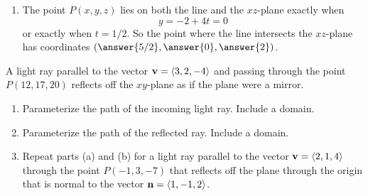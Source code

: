 \documentclass{ximera}
\begin{document}
\begin{example}
\begin{explanation}
\begin{enumerate}
\item The point $P(x,y,z)$ lies on both the line and the $xz$-plane exactly when
\[
     y = -2 + 4t = 0 
\]
or exactly when $t=1/2$. So the point where the line intersects the $xz$-plane has coordinates $(\answer{5/2}, \answer{0}, \answer{2})$.
\end{enumerate} 
\end{explanation}

\end{example} 


\begin{question}  \label{Qdr5577:Lines}
A light ray parallel to the vector ${\bf v} = \langle 3,2,-4 \rangle$ and passing through the point $P(12, 17,20)$ reflects off the $xy$-plane as if the plane were a mirror.

\begin{enumerate}

\item Parameterize the path of the incoming light ray. Include a domain.

\item Parameterize the path of the reflected ray. Include a domain.

\item Repeat parts (a) and (b) for a light ray parallel to the vector ${\bf v} = \langle 2,1,4 \rangle$ through the point $P(-1,3,-7)$ that reflects off the plane through the origin that is normal to the vector ${\bf n} = \langle  1, -1, 2 \rangle$.

\end{enumerate}

\end{question}
\end{document}
